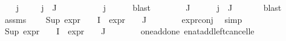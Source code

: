 \begin{isabellebody}
%
\isadelimproof
%
\endisadelimproof
%
\isatagproof
{}\isamarkupfalse%
\isanewline
\ \ \isamarkupfalse%
\ j\ \isanewline
\ \ \isamarkupfalse%
\ {\isachardoublequoteopen}j\ {\isasymin}\ J{\isachardoublequoteclose}\isanewline
\ \ \isamarkupfalse%
\ \isamarkupfalse%
\ {\isasympsi}\ \ {\isachardoublequoteopen}{\isasympsi}\ {\isacharequal}{\kern0pt}\ {\isacharparenleft}{\kern0pt}{\isasymPhi}\ j{\isacharparenright}{\kern0pt}{\isachardoublequoteclose}\isanewline
\ \ \ \ \isamarkupfalse%
\ blast\isanewline
\ \ \isamarkupfalse%
\ {\isachardoublequoteopen}{\isasympsi}\ {\isasymin}\ {\isacharparenleft}{\kern0pt}{\isasymPhi}\ {\isacharbackquote}{\kern0pt}\ J{\isacharparenright}{\kern0pt}{\isachardoublequoteclose}\isanewline
\ \ \ \ \isamarkupfalse%
\ {\isacartoucheopen}j\ {\isasymin}\ J{\isacartoucheclose}\ \isanewline
\ \ \ \ \isamarkupfalse%
\ blast\isanewline
\ \ \isamarkupfalse%
\ assms{\isacharparenleft}{\kern0pt}{}{\isacharparenright}{\kern0pt}\ \isamarkupfalse%
\ {\isachardoublequoteopen}{}\ {\isacharplus}{\kern0pt}\ Sup\ {\isacharparenleft}{\kern0pt}{\isacharparenleft}{\kern0pt}expr{\isacharunderscore}{\kern0pt}{}\ {\isasymcirc}\ {\isasymPhi}{\isacharparenright}{\kern0pt}\ {\isacharbackquote}{\kern0pt}\ I\ {\isasymunion}\ {\isacharparenleft}{\kern0pt}expr{\isacharunderscore}{\kern0pt}{}\ {\isasymcirc}\ {\isasymPhi}{\isacharparenright}{\kern0pt}\ {\isacharbackquote}{\kern0pt}\ J{\isacharparenright}{\kern0pt}\ {\isasymle}\ {}{\isachardoublequoteclose}\isanewline
\ \ \ \ \isamarkupfalse%
\ expr{\isacharunderscore}{\kern0pt}{}{\isacharunderscore}{\kern0pt}conj\ \isamarkupfalse%
\ simp\isanewline
\ \ \isamarkupfalse%
\ {\isachardoublequoteopen}Sup\ {\isacharparenleft}{\kern0pt}{\isacharparenleft}{\kern0pt}expr{\isacharunderscore}{\kern0pt}{}\ {\isasymcirc}\ {\isasymPhi}{\isacharparenright}{\kern0pt}\ {\isacharbackquote}{\kern0pt}\ I\ {\isasymunion}\ {\isacharparenleft}{\kern0pt}expr{\isacharunderscore}{\kern0pt}{}\ {\isasymcirc}\ {\isasymPhi}{\isacharparenright}{\kern0pt}\ {\isacharbackquote}{\kern0pt}\ J{\isacharparenright}{\kern0pt}\ {\isasymle}\ {}{\isachardoublequoteclose}\isanewline
\ \ \ \ \isamarkupfalse%
\ one{\isacharunderscore}{\kern0pt}add{\isacharunderscore}{\kern0pt}one\ enat{\isacharunderscore}{\kern0pt}add{\isacharunderscore}{\kern0pt}left{\isacharunderscore}{\kern0pt}cancel{\isacharunderscore}{\kern0pt}le\isanewline

\end{isabellebody}
